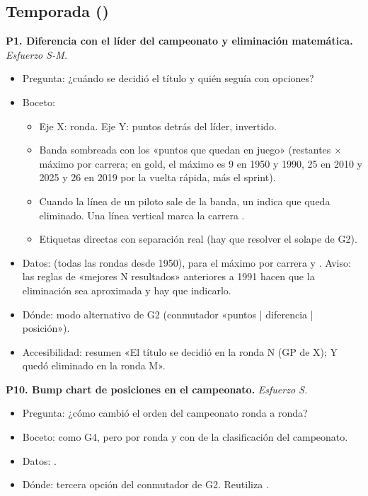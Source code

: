 \subsection{Temporada ()}

\textbf{P1. Diferencia con el líder del campeonato y eliminación matemática.} \emph{Esfuerzo S-M.}

\begin{itemize}
\item Pregunta: ¿cuándo se decidió el título y quién seguía con opciones?
\item Boceto:
\begin{itemize}
\item Eje X: ronda. Eje Y: puntos detrás del líder, invertido.
\item Banda sombreada con los «puntos que quedan en juego» (restantes × máximo por carrera; en gold, el máximo es 9 en 1950 y 1990, 25 en 2010 y 2025 y 26 en 2019 por la vuelta rápida, más el sprint).
\item Cuando la línea de un piloto sale de la banda, un \no{} indica que queda eliminado. Una línea vertical marca la carrera .
\item Etiquetas directas con separación real (hay que resolver el solape de G2).
\end{itemize}
\item Datos:  (todas las rondas desde 1950),  para el máximo por carrera y . Aviso: las reglas de «mejores N resultados» anteriores a 1991 hacen que la eliminación sea aproximada y hay que indicarlo.
\item Dónde: modo alternativo de G2 (conmutador «puntos | diferencia | posición»).
\item Accesibilidad: resumen «El título se decidió en la ronda N (GP de X); Y quedó eliminado en la ronda M».
\end{itemize}

\textbf{P10. Bump chart de posiciones en el campeonato.} \emph{Esfuerzo S.}

\begin{itemize}
\item Pregunta: ¿cómo cambió el orden del campeonato ronda a ronda?
\item Boceto: como G4, pero por ronda y con  de la clasificación del campeonato.
\item Datos: .
\item Dónde: tercera opción del conmutador de G2. Reutiliza .
\end{itemize}

